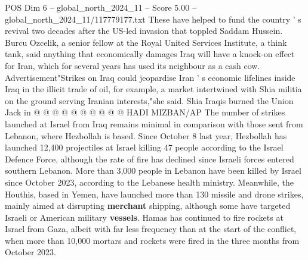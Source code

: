 \begin{textsample}{POS Dim 6 – global\_north\_2024\_11 – Score 5.00 – global\_north\_2024\_11/117779177.txt}
These have helped to fund the country ' s revival two decades after the US-led invasion that toppled Saddam Hussein.
Burcu Ozcelik, a senior fellow at the Royal United Services Institute, a think tank, said anything that economically damages Iraq will have a knock-on effect for Iran, which for several years has used its neighbour as a cash cow.
Advertisement"Strikes on Iraq could jeopardise Iran ' s economic lifelines inside Iraq in the illicit trade of oil, for example, a market intertwined with Shia militia on the ground serving Iranian interests,"she said.
Shia Iraqis burned the Union Jack in @ @ @ @ @ @ @ @ @ @ HADI MIZBAN/AP The number of strikes launched at Israel from Iraq remains minimal in comparison with those sent from Lebanon, where Hezbollah is based.
Since October 8 last year, Hezbollah has launched 12,400 projectiles at Israel killing 47 people according to the Israel Defence Force, although the rate of fire has declined since Israeli forces entered southern Lebanon.
More than 3,000 people in Lebanon have been killed by Israel since October 2023, according to the Lebanese health ministry.
Meanwhile, the Houthis, based in Yemen, have launched more than 130 missile and drone strikes, mainly aimed at disrupting \textbf{merchant} shipping, although some have targeted Israeli or American military \textbf{vessels}.
Hamas has continued to fire rockets at Israel from Gaza, albeit with far less frequency than at the start of the conflict, when more than 10,000 mortars and rockets were fired in the three months from October 2023.

\end{textsample}

